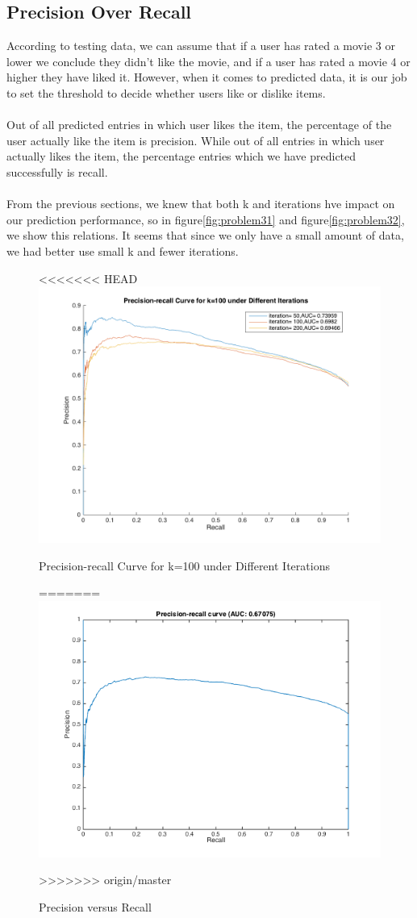 \documentclass{article}
\begin{document}
\subsection{Precision Over Recall}
According to testing data, we can assume that if a user has rated a movie 3 or lower we conclude they didn't like the movie, and if a user has rated a movie 4 or higher they have liked it. However, when it comes to predicted data, it is our job to set the threshold to decide whether users like or dislike items.\\
\\
Out of all predicted entries in which user likes the item, the percentage of the user actually like the item is precision. While out of all entries in which user actually likes the item, the percentage entries which we have predicted successfully is recall.\\
\\
From the previous sections, we knew that both k and iterations hve impact on our prediction performance, so in figure\ref{fig:problem31} and figure\ref{fig:problem32}, we show this relations. It seems that since we only have a small amount of data, we had better use small k and fewer iterations.
\begin{figure}[htbp]
\centering
<<<<<<< HEAD
\includegraphics[width=\textwidth]{problem31.png}
\caption{Precision-recall Curve for k=100 under Different Iterations}
\label{fig:problem31}
=======
\includegraphics[width=.6\textwidth]{problem3.png}
\caption{Precision versus Recall}
\label{fig:problem3}
>>>>>>> origin/master
\end{figure}
\end{document}
